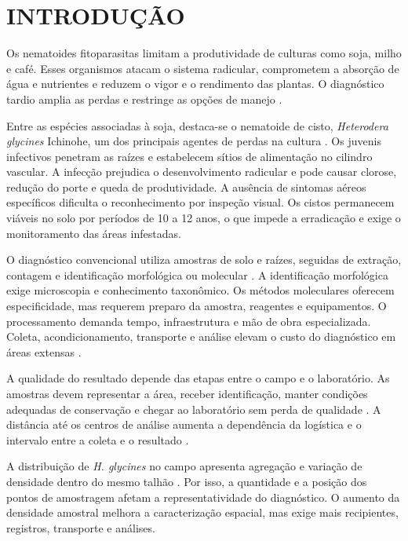 \chapter{INTRODUÇÃO}\label{Cap1}

Os nematoides fitoparasitas limitam a produtividade de culturas como soja, milho e café. Esses organismos atacam o sistema radicular, comprometem a absorção de água e nutrientes e reduzem o vigor e o rendimento das plantas. O diagnóstico tardio amplia as perdas e restringe as opções de manejo \cite{embrapa2021}.

Entre as espécies associadas à soja, destaca-se o nematoide de cisto, \textit{Heterodera glycines} Ichinohe, um dos principais agentes de perdas na cultura \cite{bent2022,aegro2024}. Os juvenis infectivos penetram as raízes e estabelecem sítios de alimentação no cilindro vascular. A infecção prejudica o desenvolvimento radicular e pode causar clorose, redução do porte e queda de produtividade. A ausência de sintomas aéreos específicos dificulta o reconhecimento por inspeção visual. Os cistos permanecem viáveis no solo por períodos de 10 a 12 anos, o que impede a erradicação e exige o monitoramento das áreas infestadas.

O diagnóstico convencional utiliza amostras de solo e raízes, seguidas de extração, contagem e identificação morfológica ou molecular \cite{luc2005,perry2013}. A identificação morfológica exige microscopia e conhecimento taxonômico. Os métodos moleculares oferecem especificidade, mas requerem preparo da amostra, reagentes e equipamentos. O processamento demanda tempo, infraestrutura e mão de obra especializada. Coleta, acondicionamento, transporte e análise elevam o custo do diagnóstico em áreas extensas \cite{neupane2025}.

A qualidade do resultado depende das etapas entre o campo e o laboratório. As amostras devem representar a área, receber identificação, manter condições adequadas de conservação e chegar ao laboratório sem perda de qualidade \cite{favoreto2019}. A distância até os centros de análise aumenta a dependência da logística e o intervalo entre a coleta e o resultado \cite{fao2018}.

A distribuição de \textit{H. glycines} no campo apresenta agregação e variação de densidade dentro do mesmo talhão \cite{avendano2003,poromarto2019}. Por isso, a quantidade e a posição dos pontos de amostragem afetam a representatividade do diagnóstico. O aumento da densidade amostral melhora a caracterização espacial, mas exige mais recipientes, registros, transporte e análises.

